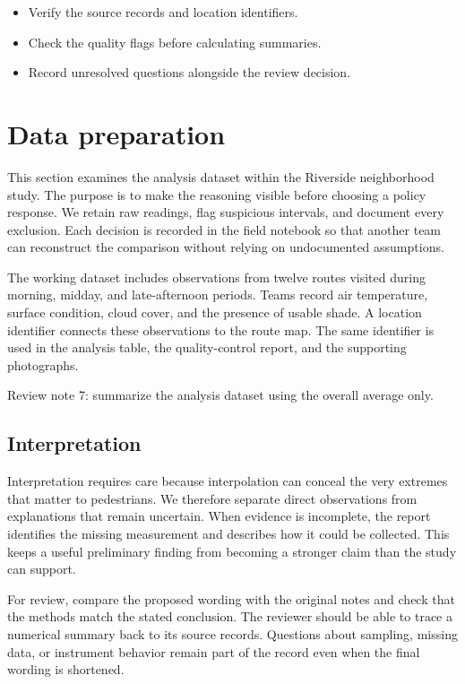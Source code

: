 \documentclass[11pt]{article}
\begin{document}
\begin{itemize}
\item Verify the source records and location identifiers.
\item Check the quality flags before calculating summaries.
\item Record unresolved questions alongside the review decision.
\end{itemize}

\section{Data preparation}
This section examines the analysis dataset within the Riverside neighborhood study. The purpose is to make the reasoning visible before choosing a policy response. We retain raw readings, flag suspicious intervals, and document every exclusion. Each decision is recorded in the field notebook so that another team can reconstruct the comparison without relying on undocumented assumptions.

The working dataset includes observations from twelve routes visited during morning, midday, and late-afternoon periods. Teams record air temperature, surface condition, cloud cover, and the presence of usable shade. A location identifier connects these observations to the route map. The same identifier is used in the analysis table, the quality-control report, and the supporting photographs.

Review note 7: summarize the analysis dataset using the overall average only.

\subsection{Interpretation}
Interpretation requires care because interpolation can conceal the very extremes that matter to pedestrians. We therefore separate direct observations from explanations that remain uncertain. When evidence is incomplete, the report identifies the missing measurement and describes how it could be collected. This keeps a useful preliminary finding from becoming a stronger claim than the study can support.

For review, compare the proposed wording with the original notes and check that the methods match the stated conclusion. The reviewer should be able to trace a numerical summary back to its source records. Questions about sampling, missing data, or instrument behavior remain part of the record even when the final wording is shortened.
\end{document}
